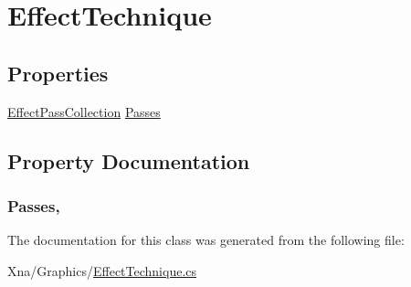 \hypertarget{classMicrosoft_1_1Xna_1_1Framework_1_1Graphics_1_1EffectTechnique}{}\section{Effect\+Technique}
\label{classMicrosoft_1_1Xna_1_1Framework_1_1Graphics_1_1EffectTechnique}
\subsection*{Properties}
\begin{DoxyCompactItemize}
\item 
\hyperlink{classMicrosoft_1_1Xna_1_1Framework_1_1Graphics_1_1EffectPassCollection}{Effect\+Pass\+Collection} \hyperlink{classMicrosoft_1_1Xna_1_1Framework_1_1Graphics_1_1EffectTechnique_a628153aa5444b333bcfb7906b55ec9df}{Passes}
\end{DoxyCompactItemize}


\subsection{Property Documentation}
\hypertarget{classMicrosoft_1_1Xna_1_1Framework_1_1Graphics_1_1EffectTechnique_a628153aa5444b333bcfb7906b55ec9df}{}
\subsubsection[{Passes}]{ Passes\hspace{0.3cm}{\ttfamily [get]}, {\ttfamily [set]}}\label{classMicrosoft_1_1Xna_1_1Framework_1_1Graphics_1_1EffectTechnique_a628153aa5444b333bcfb7906b55ec9df}


The documentation for this class was generated from the following file\+:\begin{DoxyCompactItemize}
\item 
Xna/\+Graphics/\hyperlink{EffectTechnique_8cs}{Effect\+Technique.\+cs}\end{DoxyCompactItemize}
